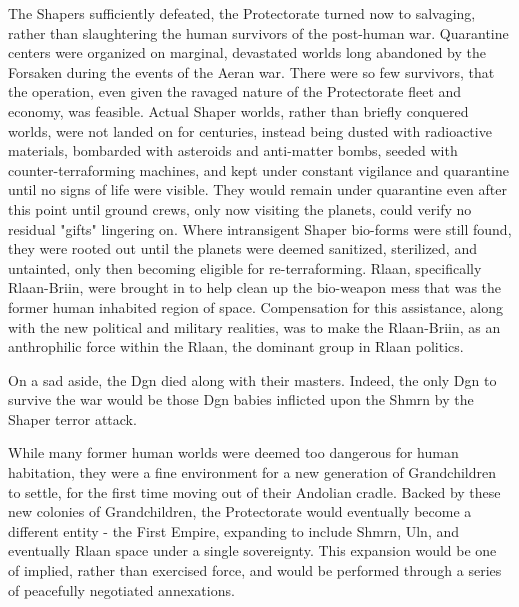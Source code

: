 The Shapers sufficiently defeated, the Protectorate turned now to
salvaging, rather than slaughtering the human survivors of the
post-human war. Quarantine centers were organized on marginal,
devastated worlds long abandoned by the Forsaken during the events of
the Aeran war. There were so few survivors, that the operation, even
given the ravaged nature of the Protectorate fleet and economy, was
feasible. Actual Shaper worlds, rather than briefly conquered worlds,
were not landed on for centuries, instead being dusted with
radioactive materials, bombarded with asteroids and anti-matter bombs,
seeded with counter-terraforming machines, and kept under constant
vigilance and quarantine until no signs of life were visible. They
would remain under quarantine even after this point until ground
crews, only now visiting the planets, could verify no residual "gifts"
lingering on. Where intransigent Shaper bio-forms were still found,
they were rooted out until the planets were deemed sanitized,
sterilized, and untainted, only then becoming eligible for
re-terraforming. Rlaan, specifically Rlaan-Briin, were brought in to
help clean up the bio-weapon mess that was the former human inhabited
region of space. Compensation for this assistance, along with the new
political and military realities, was to make the Rlaan-Briin, as an
anthrophilic force within the Rlaan, the dominant group in Rlaan
politics.

On a sad aside, the Dgn died along with their masters. Indeed, the
only Dgn to survive the war would be those Dgn babies inflicted upon
the Shmrn by the Shaper terror attack.

While many former human worlds were deemed too dangerous for human
habitation, they were a fine environment for a new generation of
Grandchildren to settle, for the first time moving out of their
Andolian cradle. Backed by these new colonies of Grandchildren, the
Protectorate would eventually become a different entity - the First
Empire, expanding to include Shmrn, Uln, and eventually Rlaan space
under a single sovereignty. This expansion would be one of implied,
rather than exercised force, and would be performed through a series
of peacefully negotiated annexations.

